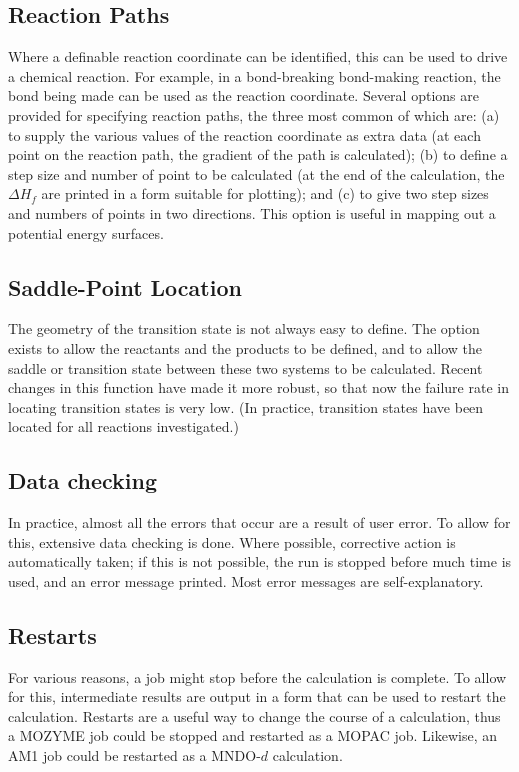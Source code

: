 \subsection{Reaction Paths}

Where a definable reaction coordinate can be identified, this can be used to
drive  a chemical reaction.  For example, in a bond-breaking bond-making
reaction,  the bond being made can be used as the reaction coordinate.  Several
options are  provided for specifying reaction paths, the three most common of
which are: (a) to supply  the various values of the reaction coordinate as
extra data (at each point on the  reaction path, the gradient of the path is
calculated); (b) to define a  step size and  number of point to be calculated
(at the end of the calculation, the  $\Delta H_f$  are  printed in a form
suitable for plotting); and (c) to give two step sizes and  numbers of points
in two directions.  This option is useful in mapping out a  potential energy
surfaces.

\subsection{Saddle-Point Location}

The geometry of the transition state is not always easy to define. The option
exists to allow the reactants and the  products to be defined, and to allow the
saddle or transition state between these  two systems to be calculated. Recent
changes in this function have made it more  robust, so that now the failure
rate in locating transition states is very low. (In  practice, transition
states have been located for all reactions investigated.)

\subsection{Data checking}

In practice, almost all the errors that occur are a result of user error.  To
allow  for this, extensive data checking is done.  Where possible, corrective
action is  automatically taken; if this is not possible, the run is stopped
before much time  is used, and an error message printed.  Most error messages
are self-explanatory.

\subsection{Restarts}

For various reasons, a job might stop before the calculation is complete.  To
allow for this, intermediate results are output in a form that can be used to
restart  the calculation.  Restarts are a useful way to change the course of a
calculation,  thus a MOZYME job could be stopped and restarted as a MOPAC
job.   Likewise, an AM1 job could be restarted as a MNDO-$d$ calculation.

